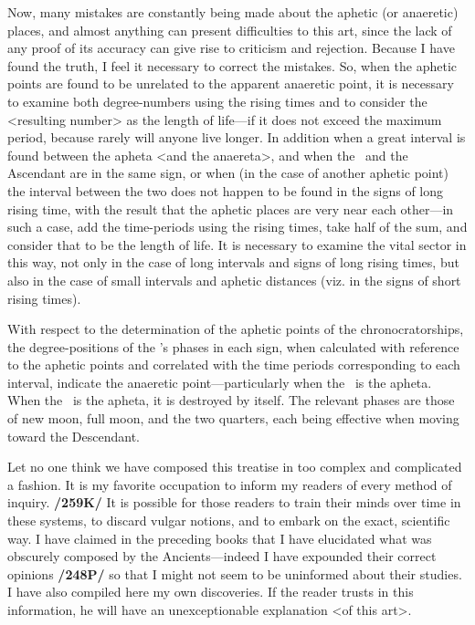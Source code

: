 Now, many mistakes are constantly being made about the aphetic (or anaeretic) places, and almost anything can present difficulties to this art, since the lack of any proof of its accuracy can give rise to criticism and rejection. Because I have found the truth, I feel it necessary to correct the mistakes. So, when the aphetic points are found to be unrelated to the apparent anaeretic point, it is necessary to examine
both degree-numbers using the rising times and to consider the <resulting number> as the length of life—if it does not exceed the maximum period, because rarely will anyone live longer. In addition when a great interval is found between the apheta <and the anaereta>, and when the \Moon\, and the Ascendant are in the
same sign, or when (in the case of another aphetic point) the interval between the two does not happen to be found in the signs of long rising time, with the result that the aphetic places are very near each other—in such a case, add the time-periods using the rising times, take half of the sum, and consider that to be the length of life. It is necessary to examine the vital sector in this way, not only in the case of long intervals and signs of long rising times, but also in the case of small intervals and aphetic distances (viz. in the signs of short rising times).

With respect to the determination of the aphetic points of the chronocratorships, the degree-positions of the \Moon’s phases in each sign, when calculated with reference to the aphetic points and correlated with the time periods corresponding to each interval, indicate the anaeretic point—particularly when the \Moon\, is the apheta. When the \Moon\, is the apheta, it is destroyed by itself. The relevant phases are those of new moon, full moon, and the two quarters, each being effective when moving toward the Descendant.

Let no one think we have composed this treatise in too complex and complicated a fashion. It is my favorite occupation to inform my readers of every method of inquiry. \textbf{/259K/} It is possible for those readers to train their minds over time in these systems, to discard vulgar notions, and to embark on the exact, scientific way. I have claimed in the preceding books that I have elucidated what was obscurely composed by the Ancients—indeed I have expounded their correct opinions \textbf{/248P/} so that I might not seem to be
uninformed about their studies. I have also compiled here my own discoveries. If the reader trusts in this information, he will have an unexceptionable explanation <of this art>. 

